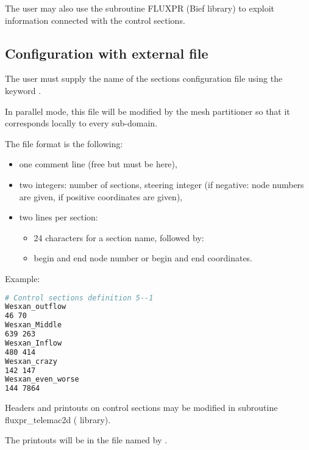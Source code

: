  The user may also use the subroutine FLUXPR (Bief library) to exploit information connected with the control sections.


\subsection{ Configuration with external file}

 The user must supply the name of the sections configuration file using the keyword .

 In parallel mode, this file will be modified by the mesh partitioner so that it corresponds locally to every sub-domain.

 The file format is the following:

\begin{itemize}
\item  one comment line (free but must be here),

\item  two integers: number of sections, steering integer (if negative: node numbers are given, if positive coordinates are given),

\item  two lines per section:

\begin{itemize}

\item  24 characters for a section name, followed by:

\item  begin and end node number or begin and end coordinates.

\end{itemize}
\end{itemize}

 Example:
\begin{lstlisting}[language=bash]
# Control sections definition 5--1
Wesxan_outflow
46 70
Wesxan_Middle
639 263
Wesxan_Inflow
480 414
Wesxan_crazy
142 147
Wesxan_even_worse
144 7864
\end{lstlisting}
 Headers and printouts on control sections may be modified in subroutine fluxpr\_telemac2d ( library).

 The printouts will be in the file named by .


